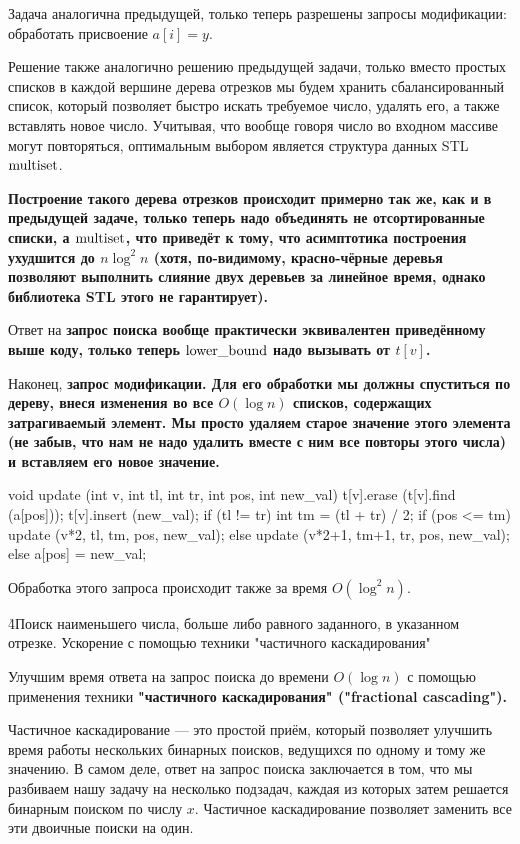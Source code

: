 Задача аналогична предыдущей, только теперь разрешены запросы модификации: обработать присвоение $a[i] = y$.

Решение также аналогично решению предыдущей задачи, только вместо простых списков в каждой вершине дерева отрезков мы будем хранить сбалансированный список, который позволяет быстро искать требуемое число, удалять его, а также вставлять новое число. Учитывая, что вообще говоря число во входном массиве могут повторяться, оптимальным выбором является структура данных STL $\rm multiset$.

\bf{Построение} такого дерева отрезков происходит примерно так же, как и в предыдущей задаче, только теперь надо объединять не отсортированные списки, а $\rm multiset$, что приведёт к тому, что асимптотика построения ухудшится до $n \log^2 n$ (хотя, по-видимому, красно-чёрные деревья позволяют выполнить слияние двух деревьев за линейное время, однако библиотека STL этого не гарантирует).

Ответ на \bf{запрос поиска} вообще практически эквивалентен приведённому выше коду, только теперь $\rm lower\_bound$ надо вызывать от $t[v]$.

Наконец, \bf{запрос модификации}. Для его обработки мы должны спуститься по дереву, внеся изменения во все $O (\log n)$ списков, содержащих затрагиваемый элемент. Мы просто удаляем старое значение этого элемента (не забыв, что нам не надо удалить вместе с ним все повторы этого числа) и вставляем его новое значение.

\code
void update (int v, int tl, int tr, int pos, int new_val) {
	t[v].erase (t[v].find (a[pos]));
	t[v].insert (new_val);
	if (tl != tr) {
		int tm = (tl + tr) / 2;
		if (pos <= tm)
			update (v*2, tl, tm, pos, new_val);
		else
			update (v*2+1, tm+1, tr, pos, new_val);
	}
	else
		a[pos] = new_val;
}
\endcode

Обработка этого запроса происходит также за время $O (\log^2 n)$.

\h4{Поиск наименьшего числа, больше либо равного заданного, в указанном отрезке. Ускорение с помощью техники "частичного каскадирования"}

Улучшим время ответа на запрос поиска до времени $O (\log n)$ с помощью применения техники \bf{"частичного каскадирования"} ("fractional cascading").

Частичное каскадирование --- это простой приём, который позволяет улучшить время работы нескольких бинарных поисков, ведущихся по одному и тому же значению. В самом деле, ответ на запрос поиска заключается в том, что мы разбиваем нашу задачу на несколько подзадач, каждая из которых затем решается бинарным поиском по числу $x$. Частичное каскадирование позволяет заменить все эти двоичные поиски на один.

